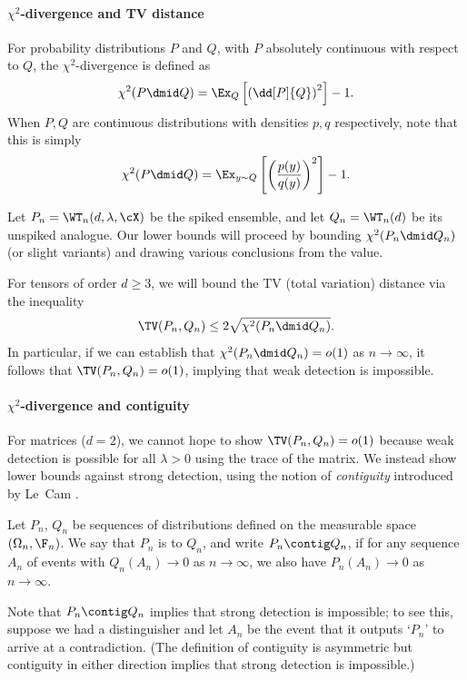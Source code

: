 \documentclass{article}
\begin{document}
\paragraph{$\chi^2$-divergence and TV distance}
For probability distributions $P$ and $Q$, with $P$ absolutely continuous with respect to $Q$, the $\chi^2$-divergence is defined as
$$ \chi^2(P \dmid Q) = \Ex_{Q}\left[ \left(\dd[P]{Q}\right)^2 \right] - 1. $$
When $P,Q$ are continuous distributions with densities $p,q$ respectively, note that this is simply
$$ \chi^2(P \dmid Q) = \Ex_{y \sim Q}\left[ \left(\frac{p(y)}{q(y)}\right)^2 \right] - 1.$$

Let $P_n = \WT_n(d,\lambda,\cX)$ be the spiked ensemble, and let $Q_n = \WT_n(d)$ be its unspiked analogue. Our lower bounds will proceed by bounding $\chi^2(P_n \dmid Q_n)$ (or slight variants) and drawing various conclusions from the value.

For tensors of order $d \geq 3$, we will bound the TV (total variation) distance via the inequality
\begin{equation} \TV(P_n,Q_n) \leq 2 \sqrt{\chi^2(P_n \dmid Q_n)}. \label{eq:chi2-pinsker}\end{equation}
In particular, if we can establish that $\chi^2(P_n \dmid Q_n) = o(1)$ as $n\to\infty$, it follows that $\TV(P_n,Q_n) = o(1)$, implying that weak detection is impossible.

\paragraph{$\chi^2$-divergence and contiguity} For matrices ($d=2$), we cannot hope to show $\TV(P_n,Q_n) = o(1)$ because weak detection is possible for all $\lambda > 0$ using the trace of the matrix. We instead show lower bounds against strong detection, using the notion of \emph{contiguity} introduced by Le~Cam \cite{lecam}.

\begin{definition}
Let $P_n$, $Q_n$ be sequences of distributions defined on the measurable space $(\Omega_n,\F_n)$. We say that $P_n$ is  to $Q_n$, and write $P_n \contig Q_n$, if for any sequence $A_n$ of events with $Q_n(A_n) \to 0$ as $n \to \infty$, we also have $P_n(A_n) \to 0$ as $n \to \infty$.
\end{definition}

\noindent Note that $P_n \contig Q_n$ implies that strong detection is impossible; to see this, suppose we had a distinguisher and let $A_n$ be the event that it outputs `$P_n$' to arrive at a contradiction. (The definition of contiguity is asymmetric but contiguity in either direction implies that strong detection is impossible.)
\end{document}
